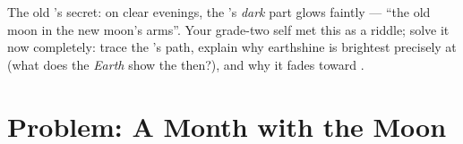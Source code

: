 \begin{exercise}[$\star\star\star$]\label{exo:g7:moon-phases:12}
The old 's secret: on clear evenings, the 
's \emph{dark} part glows faintly --- ``the old moon in the
new moon's arms''. Your grade-two self met this as a riddle;
solve it now completely: trace the 's path, explain why
earthshine is brightest precisely at   (what
 does the \emph{Earth} show the  then?), and why it
fades toward .
\end{exercise}

\section{Problem: A Month with the Moon}

